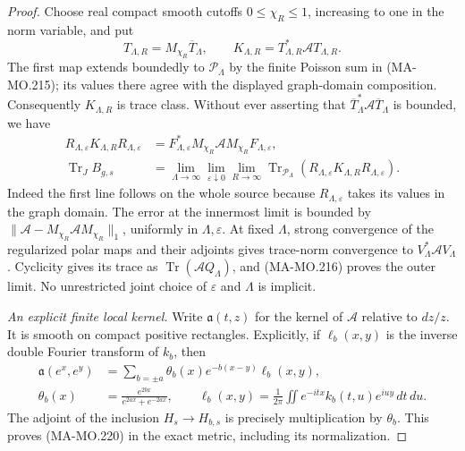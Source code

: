 \begin{proof}
Choose real compact smooth cutoffs \(0\le\chi_R\le1\),
increasing to one in the norm variable, and put
\[
 T_{\Lambda,R}=M_{\chi_R}\overline T_\Lambda,
 \qquad K_{\Lambda,R}=T_{\Lambda,R}^*\mathcal A T_{\Lambda,R}.
 \tag{MA-MO.218}
\]
The first map extends boundedly to \(\mathcal P_\Lambda\)
by the finite Poisson sum in (MA-MO.215); its values there
agree with the displayed graph-domain composition.
Consequently \(K_{\Lambda,R}\) is trace class.  Without
ever asserting that \(\overline T_\Lambda^*\mathcal A
\overline T_\Lambda\) is bounded, we have
\[
 \begin{aligned}
 R_{\Lambda,\varepsilon}K_{\Lambda,R}R_{\Lambda,\varepsilon}
 &=F_{\Lambda,\varepsilon}^*M_{\chi_R}\mathcal A
                    M_{\chi_R}F_{\Lambda,\varepsilon},\\
 \operatorname{Tr}_{J}B_{g,s}
 &=\lim_{\Lambda\to\infty}\lim_{\varepsilon\downarrow0}
       \lim_{R\to\infty}
       \operatorname{Tr}_{\mathcal P_\Lambda}
       (R_{\Lambda,\varepsilon}K_{\Lambda,R}
                                      R_{\Lambda,\varepsilon}).
 \end{aligned}
 \tag{MA-MO.219}
\]
Indeed the first line follows on the whole source because
\(R_{\Lambda,\varepsilon}\) takes its values in the graph
domain.  The error at the innermost limit is bounded by
\(\|\mathcal A-M_{\chi_R}\mathcal A M_{\chi_R}\|_1\),
uniformly in \(\Lambda,\varepsilon\).  At fixed \(\Lambda\),
strong convergence of the regularized polar maps and their
adjoints gives trace-norm convergence to
\(V_\Lambda^*\mathcal A V_\Lambda\).  Cyclicity gives its
trace as \(\operatorname{Tr}(\mathcal A Q_\Lambda)\), and
(MA-MO.216) proves the outer limit.  No unrestricted joint
choice of \(\varepsilon\) and \(\Lambda\) is implicit.

\emph{An explicit finite local kernel.}
Write \(\mathfrak a(t,z)\) for the kernel of \(\mathcal A\)
relative to \(dz/z\).  It is smooth on compact positive
rectangles.  Explicitly, if \(\ell_b(x,y)\) is the inverse
double Fourier transform of \(k_b\), then
\[
 \begin{aligned}
 \mathfrak a(e^x,e^y)
   &=\sum_{b=\pm a}\theta_b(x)e^{-b(x-y)}\ell_b(x,y),\\
 \theta_b(x)&=\frac{e^{2bx}}{e^{2ax}+e^{-2ax}},\qquad
 \ell_b(x,y)=\frac1{2\pi}\iint
                 e^{-itx}k_b(t,u)e^{iuy}\,dt\,du .
 \end{aligned}
 \tag{MA-MO.220}
\]
The adjoint of the inclusion \(H_s\to H_{b,s}\) is
precisely multiplication by \(\theta_b\).  This proves
(MA-MO.220) in the exact metric, including its normalization.


\end{proof}
